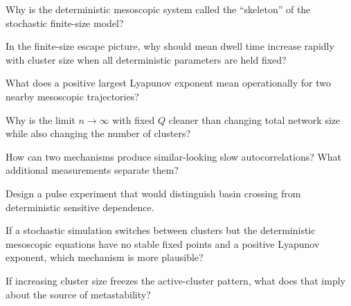 \begin{conceptquestions}
  \item Why is the deterministic mesoscopic system called the ``skeleton'' of the stochastic finite-size model?

  \item In the finite-size escape picture, why should mean dwell time increase rapidly with cluster size when all deterministic parameters are held fixed?

  \item What does a positive largest Lyapunov exponent mean operationally for two nearby mesoscopic trajectories?

  \item Why is the limit $n\to\infty$ with fixed $Q$ cleaner than changing total network size while also changing the number of clusters?

  \item How can two mechanisms produce similar-looking slow autocorrelations? What additional measurements separate them?

  \item Design a pulse experiment that would distinguish basin crossing from deterministic sensitive dependence.

  \item If a stochastic simulation switches between clusters but the deterministic mesoscopic equations have no stable fixed points and a positive Lyapunov exponent, which mechanism is more plausible?

  \item If increasing cluster size freezes the active-cluster pattern, what does that imply about the source of metastability?
\end{conceptquestions}
